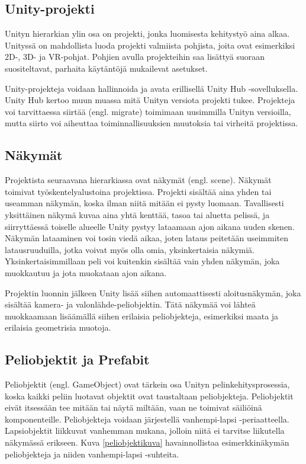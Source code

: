 \documentclass[utf8]{gradu3}
\begin{document}
\subsection{Unity-projekti}

Unityn hierarkian ylin osa on projekti, jonka luomisesta kehitystyö aina alkaa. Unityssä on mahdollista luoda projekti valmiista pohjista, joita ovat esimerkiksi 2D-, 3D- ja VR-pohjat. Pohjien avulla projekteihin saa lisättyä suoraan suositeltavat, parhaita käytäntöjä mukailevat asetukset.

Unity-projekteja voidaan hallinnoida ja avata erillisellä Unity Hub -sovelluksella. Unity Hub kertoo muun muassa mitä Unityn versiota projekti tukee. Projekteja voi tarvittaessa siirtää (engl. migrate) toimimaan uusimmilla Unityn versioilla, mutta siirto voi aiheuttaa toiminnallisuuksien muutoksia tai virheitä projektissa.

\subsection{Näkymät}

Projektista seuraavana hierarkiassa ovat näkymät (engl. scene). Näkymät toimivat työskentelyalustoina projektissa. Projekti sisältää aina yhden tai useamman näkymän, koska ilman niitä mitään ei pysty luomaan. Tavallisesti yksittäinen näkymä kuvaa aina yhtä kenttää, tasoa tai aluetta pelissä, ja siirryttäessä toiselle alueelle Unity pystyy lataamaan ajon aikana uuden skenen. Näkymän lataaminen voi tosin viedä aikaa, joten lataus peitetään useimmiten latausruuduilla, jotka voivat myös olla omia, yksinkertaisia näkymiä. Yksinkertaisimmillaan peli voi kuitenkin sisältää vain yhden näkymän, joka muokkautuu ja jota muokataan ajon aikana.

Projektin luonnin jälkeen Unity lisää siihen automaattisesti aloitusnäkymän, joka sisältää kamera- ja valonlähde-peliobjektin. Tätä näkymää voi lähteä muokkaamaan lisäämällä siihen erilaisia peliobjekteja, esimerkiksi maata ja erilaisia geometrisia muotoja.

\subsection{Peliobjektit ja Prefabit}

Peliobjektit (engl. GameObject) ovat tärkein osa Unityn pelinkehitysprosessia, koska kaikki peliin luotavat objektit ovat taustaltaan peliobjekteja. Peliobjektit eivät itsessään tee mitään tai näytä miltään, vaan ne toimivat säiliöinä komponenteille. Peliobjekteja voidaan järjestellä vanhempi-lapsi -periaatteella. Lapsiobjektit liikkuvat vanhemman mukana, jolloin niitä ei tarvitse liikutella näkymässä erikseen. Kuva \ref{peliobjektikuva} havainnollistaa esimerkkinäkymän peliobjekteja ja niiden vanhempi-lapsi -suhteita.
\end{document}
